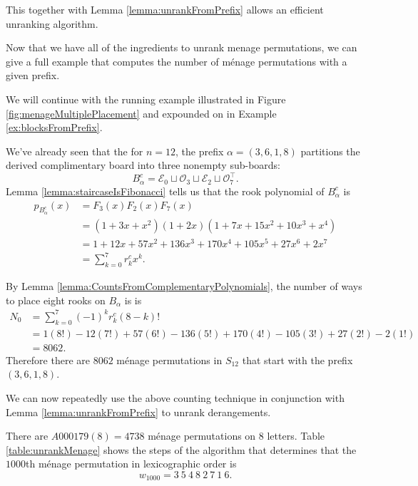 This together with Lemma \ref{lemma:unrankFromPrefix} allows an efficient
unranking algorithm.

Now that we have all of the ingredients to unrank menage permutations,
we can give a full example that computes the number of m\'enage
permutations with a given prefix.

\begin{example}
  We will continue with the running example illustrated in
  Figure \ref{fig:menageMultiplePlacement} and expounded on
  in Example \ref{ex:blocksFromPrefix}.

  We've already seen that the for $n = 12$, the prefix $\alpha = (3,6,1,8)$
  partitions the derived complimentary board into three nonempty sub-boards: \[
    B_\alpha^c = \mathcal{E}_0 \sqcup \mathcal{O}_3 \sqcup \mathcal{E}_2 \sqcup \mathcal{O}_7^\intercal.
  \] Lemma \ref{lemma:staircaseIsFibonacci} tells us that the rook polynomial of
  $B_\alpha^c$ is \begin{align}
    p_{B_\alpha^c}(x)
    &= F_3(x)F_2(x)F_7(x) \\
    &= (1 + 3x + x^2)(1 + 2x)(1 + 7x + 15x^2 + 10x^3 + x^4) \\
    &= 1 + 12 x + 57 x^2 + 136 x^3 + 170 x^4 + 105 x^5 + 27 x^6 + 2 x^7 \\
    &= \sum_{k=0}^7 r_k^c x^k.
  \end{align}

  By Lemma \ref{lemma:CountsFromComplementaryPolynomials},
  the number of ways to place eight rooks on $B_\alpha$ is
  is \begin{align}
    N_0
      &= \sum_{k=0}^{7} (-1)^k r_k^c (8-k)! \\
      &= 1(8!) - 12(7!) + 57(6!) - 136(5!) + 170(4!) - 105(3!) + 27(2!) - 2(1!) \\
      &= 8062.
  \end{align}
  Therefore there are $8062$ m\'enage permutations in $S_{12}$ that start with
  the prefix $(3,6,1,8)$.
\end{example}

We can now repeatedly use the above counting technique in conjunction with
Lemma \ref{lemma:unrankFromPrefix} to unrank derangements.

\begin{example}
  There are $A000179(8) = 4738$ m\'enage permutations on $8$ letters.
  Table \ref{table:unrankMenage} shows the steps of the algorithm that
  determines that the $1000$th m\'enage permutation in lexicographic order is
  \[
    w_{1000} = 3 \ 5 \ 4 \ 8 \ 2 \ 7 \ 1 \ 6.
  \]
\end{example}

